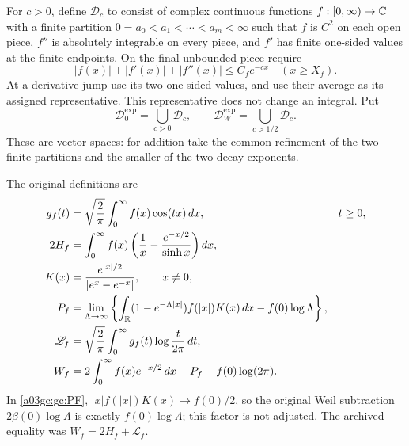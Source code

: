 For $c>0$, define $\mathcal D_c$ to consist of complex continuous functions
$f:[0,\infty)\to\mathbb C$ with a finite partition
$0=a_0<a_1<\cdots<a_m<\infty$ such that $f$ is $C^2$ on each open piece,
$f''$ is absolutely integrable on every piece, and $f'$ has finite
one-sided values at the finite endpoints.  On the final unbounded piece
require
\begin{equation}
 |f(x)|+|f'(x)|+|f''(x)|\le C_f e^{-cx}
 \quad (x\ge X_f).
 \label{a03gc:gc:decay}
\end{equation}
At a derivative jump use its two one-sided values, and use their average
as its assigned representative.  This representative does not change an
integral.  Put
\begin{equation}
 \mathcal D_0^{\exp}=\bigcup_{c>0}\mathcal D_c,
 \qquad \mathcal D_W^{\exp}=\bigcup_{c>1/2}\mathcal D_c.
 \label{a03gc:gc:domains}
\end{equation}
These are vector spaces: for addition take the common refinement of the
two finite partitions and the smaller of the two decay exponents.

The original definitions are
\begin{align}
 g_f(t)&=\sqrt{\frac2\pi}\int_0^\infty f(x)\cos(tx)\,dx,
 &&t\ge0,\label{a03gc:gc:cosine}\\
 2H_f&=\int_0^\infty f(x)
       \left(\frac1x-\frac{e^{-x/2}}{\sinh x}\right)dx,
 \label{a03gc:gc:H}\\
 K(x)&=\frac{e^{|x|/2}}{|e^x-e^{-x}|},\qquad x\ne0,
 \label{a03gc:gc:K}\\
 P_f&=\lim_{\Lambda\to\infty}
 \left\{\int_\mathbb R(1-e^{-\Lambda|x|})f(|x|)K(x)\,dx
              -f(0)\log\Lambda\right\},
 \label{a03gc:gc:PF}\\
 \mathscr L_f&=\sqrt{\frac2\pi}\int_0^\infty
             g_f(t)\log\frac{t}{2\pi}\,dt,
 \label{a03gc:gc:L}\\
 W_f&=2\int_0^\infty f(x)e^{-x/2}\,dx-P_f-f(0)\log(2\pi).
 \label{a03gc:gc:W}
\end{align}
In \eqref{a03gc:gc:PF}, $|x|f(|x|)K(x)\to f(0)/2$, so the original
Weil subtraction $2\beta(0)\log\Lambda$ is exactly
$f(0)\log\Lambda$; this factor is not adjusted.
The archived equality was $W_f=2H_f+\mathscr L_f$.

